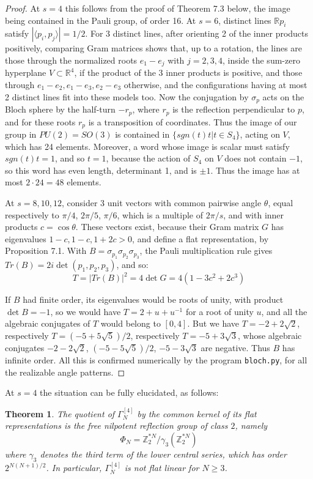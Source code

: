 \documentclass[12pt]{amsart}
\newtheorem{theorem}{Theorem}[section]
\theoremstyle{definition}
\begin{document}
\begin{proof}
At $s=4$ this follows from the proof of Theorem 7.3 below, the image being contained in the Pauli group, of order 16. At $s=6$, distinct lines $\mathbb Rp_i$ satisfy $|\langle p_i,p_j\rangle|=1/2$. For 3 distinct lines, after orienting 2 of the inner products positively, comparing Gram matrices shows that, up to a rotation, the lines are those through the normalized roots $e_1-e_j$ with $j=2,3,4$, inside the sum-zero hyperplane $V\subset\mathbb R^4$, if the product of the 3 inner products is positive, and those through $e_1-e_2,e_1-e_3,e_2-e_3$ otherwise, and the configurations having at most 2 distinct lines fit into these models too. Now the conjugation by $\sigma_p$ acts on the Bloch sphere by the half-turn $-r_p$, where $r_p$ is the reflection perpendicular to $p$, and for these roots $r_p$ is a transposition of coordinates. Thus the image of our group in $PU(2)=SO(3)$ is contained in $\{sgn(t)t|t\in S_4\}$, acting on $V$, which has 24 elements. Moreover, a word whose image is scalar must satisfy $sgn(t)t=1$, and so $t=1$, because the action of $S_4$ on $V$ does not contain $-1$, so this word has even length, determinant 1, and is $\pm1$. Thus the image has at most $2\cdot24=48$ elements.

At $s=8,10,12$, consider 3 unit vectors with common pairwise angle $\theta$, equal respectively to $\pi/4$, $2\pi/5$, $\pi/6$, which is a multiple of $2\pi/s$, and with inner products $c=\cos\theta$. These vectors exist, because their Gram matrix $G$ has eigenvalues $1-c,1-c,1+2c>0$, and define a flat representation, by Proposition 7.1. With $B=\sigma_{p_1}\sigma_{p_2}\sigma_{p_3}$, the Pauli multiplication rule gives $Tr(B)=2i\det(p_1,p_2,p_3)$, and so:
$$T=|Tr(B)|^2=4\det G=4(1-3c^2+2c^3)$$

If $B$ had finite order, its eigenvalues would be roots of unity, with product $\det B=-1$, so we would have $T=2+u+u^{-1}$ for a root of unity $u$, and all the algebraic conjugates of $T$ would belong to $[0,4]$. But we have $T=-2+2\sqrt{2}$, respectively $T=(-5+5\sqrt{5})/2$, respectively $T=-5+3\sqrt{3}$, whose algebraic conjugates $-2-2\sqrt{2}$, $(-5-5\sqrt{5})/2$, $-5-3\sqrt{3}$ are negative. Thus $B$ has infinite order. All this is confirmed numerically by the program {\tt bloch.py}, for all the realizable angle patterns.
\end{proof}

At $s=4$ the situation can be fully elucidated, as follows:

\begin{theorem}
The quotient of $\Gamma_N^{[4]}$ by the common kernel of its flat representations is the free nilpotent reflection group of class $2$, namely
$$\Phi_N=\mathbb Z_2^{*N}\big/\gamma_3(\mathbb Z_2^{*N})$$
where $\gamma_3$ denotes the third term of the lower central series, which has order $2^{N(N+1)/2}$. In particular, $\Gamma_N^{[4]}$ is not flat linear for $N\geq3$.
\end{theorem}
\end{document}
